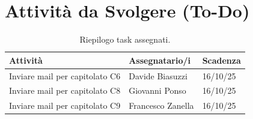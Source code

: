 \section{Attività da Svolgere (To-Do)}

\begin{table}[h!]
\centering
\begin{tabular}{@{}lll@{}}
\toprule
\textbf{Attività} & \textbf{Assegnatario/i} & \textbf{Scadenza} \\
\midrule
Inviare mail per capitolato C6 & Davide Biasuzzi & 16/10/25 \\
Inviare mail per capitolato C8 & Giovanni Ponso & 16/10/25 \\
Inviare mail per capitolato C9 & Francesco Zanella & 16/10/25 \\
\bottomrule
\end{tabular}
\caption{Riepilogo task assegnati.}
\end{table}


